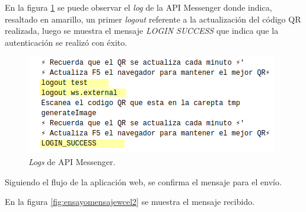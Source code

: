 En la figura \ref{fig:ensayomensajeapi} se puede observar el \textit{log} de la API Messenger donde indica, resaltado en amarillo, un primer \textit{logout} referente a la actualización del código QR realizada, luego se muestra el mensaje \textit{LOGIN SUCCESS} que indica que la autenticación se realizó con éxito.

\begin{figure}[H]
	\centering
	\includegraphics[scale=.99]{./Figures/ensayo-1/15-qr-api.png}
	\caption{\textit{Logs} de API Messenger.}
	\label{fig:ensayomensajeapi}
\end{figure}	

Siguiendo el flujo de la aplicación web, se confirma el mensaje para el envío. 

En la figura \ref{fig:ensayomensajewcel2} se muestra el mensaje recibido.

